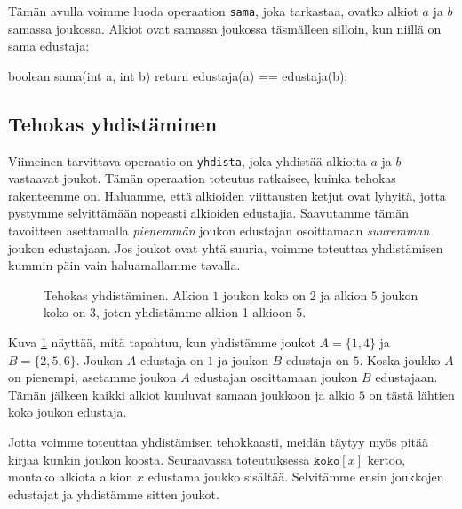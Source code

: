 Tämän avulla voimme luoda operaation \texttt{sama}, joka tarkastaa,
ovatko alkiot $a$ ja $b$ samassa joukossa.
Alkiot ovat samassa joukossa täsmälleen silloin, kun niillä
on sama edustaja:

\begin{code}
boolean sama(int a, int b) {
    return edustaja(a) == edustaja(b);
}
\end{code}

\subsection{Tehokas yhdistäminen}

Viimeinen tarvittava operaatio on \texttt{yhdista}, joka yhdistää alkioita
$a$ ja $b$ vastaavat joukot.
Tämän operaation toteutus ratkaisee, kuinka tehokas rakenteemme on.
Haluamme, että alkioiden viittausten ketjut ovat lyhyitä,
jotta pystymme selvittämään nopeasti alkioiden edustajia.
Saavutamme tämän tavoitteen asettamalla \emph{pienemmän} joukon
edustajan osoittamaan \emph{suuremman} joukon edustajaan.
Jos joukot ovat yhtä suuria, voimme toteuttaa yhdistämisen
kummin päin vain haluamallamme tavalla.

\begin{figure}
\center
\begin{center}
\end{center}
\caption{Tehokas yhdistäminen. Alkion $1$ joukon koko on 2
ja alkion $5$ joukon koko on 3,
joten yhdistämme alkion 1 alkioon 5.}
\label{fig:tehyhd}
\end{figure}

Kuva \ref{fig:tehyhd} näyttää, mitä tapahtuu, kun yhdistämme joukot
$A=\{1,4\}$ ja $B=\{2,5,6\}$.
Joukon $A$ edustaja on $1$ ja joukon $B$ edustaja on $5$.
Koska joukko $A$ on pienempi, asetamme joukon $A$
edustajan osoittamaan joukon $B$ edustajaan.
Tämän jälkeen kaikki alkiot kuuluvat samaan joukkoon ja
alkio $5$ on tästä lähtien koko joukon edustaja.

Jotta voimme toteuttaa yhdistämisen tehokkaasti,
meidän täytyy myös pitää kirjaa kunkin joukon koosta.
Seuraavassa toteutuksessa $\texttt{koko}[x]$ kertoo,
montako alkiota alkion $x$ edustama joukko sisältää.
Selvitämme ensin joukkojen edustajat ja yhdistämme sitten joukot.

